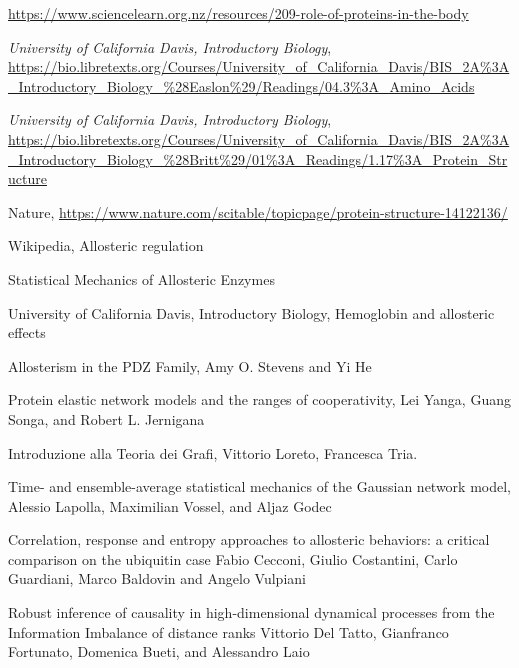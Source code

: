 \documentclass[English, Lau, oneside]{sapthesis}
\begin{document}
\newpage
\newpage







\newpage
\null
\thispagestyle{empty}
\newpage
\begin{thebibliography}{100}

    \url{https://www.sciencelearn.org.nz/resources/209-role-of-proteins-in-the-body}
    
    \emph{University of California Davis, Introductory Biology}, 
    \url{https://bio.libretexts.org/Courses/University_of_California_Davis/BIS_2A%3A_Introductory_Biology_%28Easlon%29/Readings/04.3%3A_Amino_Acids}
    
    \emph{University of California Davis, Introductory Biology}, 
    \url{https://bio.libretexts.org/Courses/University_of_California_Davis/BIS_2A%3A_Introductory_Biology_%28Britt%29/01%3A_Readings/1.17%3A_Protein_Structure}
    
    Nature, \url{https://www.nature.com/scitable/topicpage/protein-structure-14122136/}
    
    Wikipedia, Allosteric regulation 
    
    Statistical Mechanics of Allosteric Enzymes
    
    University of California Davis, Introductory Biology, Hemoglobin and allosteric effects
    
    Allosterism in the PDZ Family, Amy O. Stevens and Yi He
    
    Protein elastic network models and the ranges of cooperativity, Lei Yanga, Guang Songa, and Robert L. Jernigana
    
    Introduzione alla Teoria dei Grafi, Vittorio Loreto, Francesca Tria.
    
    Time- and ensemble-average statistical mechanics of the Gaussian network model, Alessio Lapolla, Maximilian Vossel, and Aljaz Godec
    
    Correlation, response and entropy approaches to allosteric behaviors: a critical comparison on the ubiquitin case Fabio Cecconi, Giulio Costantini, Carlo Guardiani, Marco Baldovin and Angelo Vulpiani
    
    Robust inference of causality in high-dimensional dynamical processes from the Information Imbalance of distance ranks
    Vittorio Del Tatto, Gianfranco Fortunato, Domenica Bueti, and Alessandro Laio
\end{thebibliography}
\end{document}
